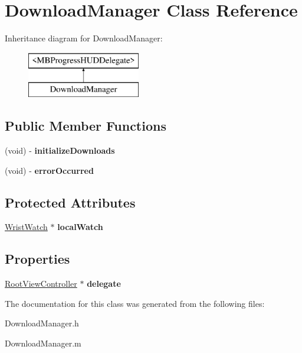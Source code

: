 \hypertarget{interface_download_manager}{
\section{DownloadManager Class Reference}
\label{interface_download_manager}
}
Inheritance diagram for DownloadManager:\begin{figure}[H]
\begin{center}
\leavevmode
\includegraphics[height=2.000000cm]{interface_download_manager}
\end{center}
\end{figure}
\subsection*{Public Member Functions}
\begin{DoxyCompactItemize}
\item 
\hypertarget{interface_download_manager_af1f8c0fbd3f3d7ffebeae0581fa575ee}{
(void) -\/ {\bfseries initializeDownloads}}
\label{interface_download_manager_af1f8c0fbd3f3d7ffebeae0581fa575ee}

\item 
\hypertarget{interface_download_manager_ac93a7687ac60c26ac77ad4c807ec1d33}{
(void) -\/ {\bfseries errorOccurred}}
\label{interface_download_manager_ac93a7687ac60c26ac77ad4c807ec1d33}

\end{DoxyCompactItemize}
\subsection*{Protected Attributes}
\begin{DoxyCompactItemize}
\item 
\hypertarget{interface_download_manager_acd2a41fcf3fb86cc37149160fa1b5d24}{
\hyperlink{interface_wrist_watch}{WristWatch} $\ast$ {\bfseries localWatch}}
\label{interface_download_manager_acd2a41fcf3fb86cc37149160fa1b5d24}

\end{DoxyCompactItemize}
\subsection*{Properties}
\begin{DoxyCompactItemize}
\item 
\hypertarget{interface_download_manager_a51834a9bcacc5c40b73e63aae47bd2da}{
\hyperlink{interface_root_view_controller}{RootViewController} $\ast$ {\bfseries delegate}}
\label{interface_download_manager_a51834a9bcacc5c40b73e63aae47bd2da}

\end{DoxyCompactItemize}


The documentation for this class was generated from the following files:\begin{DoxyCompactItemize}
\item 
DownloadManager.h\item 
DownloadManager.m\end{DoxyCompactItemize}
